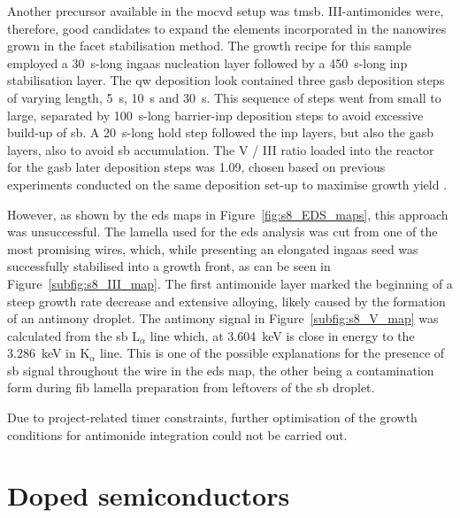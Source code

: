 Another precursor available in the \acs{mocvd} setup was \acf{tmsb}. III-antimonides were, therefore, good candidates to expand the elements incorporated in the nanowires grown in the  facet stabilisation method. The growth recipe for this sample employed a \qty{30}{\second}-long \acs{ingaas} nucleation layer followed by a \qty{450}{\second}-long \acs{inp} stabilisation layer. The \acl{qw} deposition look contained three \acf{gasb} deposition steps of varying length, \qty{5}{\second}, \qty{10}{\second} and \qty{30}{\second}. This sequence of steps went from small to large, separated by \qty{100}{\second}-long barrier-\acs{inp} deposition steps to avoid excessive build-up of \acl{sb}. A \qty{20}{\second}-long hold step followed the \acs{inp} layers, but also the \acs{gasb} layers, also to avoid \acl{sb} accumulation. The V / III ratio loaded into the reactor for the \acs{gasb} later deposition steps was \num{1.09}, chosen based on previous experiments conducted on the same deposition set-up to maximise growth yield \cite{Borg2017}.

However, as shown by the \acs{eds} maps in Figure~\ref{fig:s8_EDS_maps}, this approach was unsuccessful. The lamella used for the \acs{eds} analysis was cut from one of the most promising wires, which, while presenting an elongated \acs{ingaas} seed was successfully stabilised into a  growth front, as can be seen in Figure~\ref{subfig:s8_III_map}. The first antimonide layer marked the beginning of a steep growth rate decrease and extensive alloying, likely caused by the formation of an antimony droplet. The antimony signal in Figure~\ref{subfig:s8_V_map} was calculated from the \acl{sb} L\(_\alpha\) line which, at \qty{3.604}{\kilo\eV} is close in energy to the \qty{3.286}{\kilo\eV} \acl{in} K\(_\alpha\) line. This is one of the possible explanations for the presence of \acl{sb} signal throughout the wire in the \acs{eds} map, the other being a contamination form during \acs{fib} lamella preparation from leftovers of the \acl{sb} droplet.

Due to project-related timer constraints, further optimisation of the growth conditions for antimonide integration could not be carried out.

\section{Doped semiconductors}


